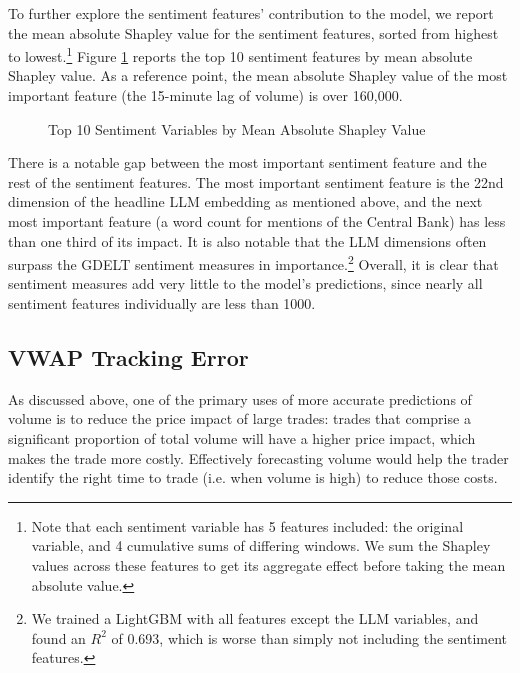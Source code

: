 \documentclass[12pt]{article}
\begin{document}
To further explore the sentiment features' contribution to the model, we report the mean absolute Shapley value for the sentiment features, sorted from highest to lowest.\footnote{Note that each sentiment variable has 5 features included: the original variable, and 4 cumulative sums of differing windows. We sum the Shapley values across these features to get its aggregate effect before taking the mean absolute value.} Figure \ref{fig:shapley_sentiment} reports the top 10 sentiment features by mean absolute Shapley value. As a reference point, the mean absolute Shapley value of the most important feature (the 15-minute lag of volume) is over 160,000.
\begin{figure}[H]
    \centering
    \caption{Top 10 Sentiment Variables by Mean Absolute Shapley Value}
    \label{fig:shapley_sentiment}
\end{figure}
There is a notable gap between the most important sentiment feature and the rest of the sentiment features. The most important sentiment feature is the 22nd dimension of the headline LLM embedding as mentioned above, and the next most important feature (a word count for mentions of the Central Bank) has less than one third of its impact. It is also notable that the LLM dimensions often surpass the GDELT sentiment measures in importance.\footnote{We trained a LightGBM with all features except the LLM variables, and found an $R^2$ of 0.693, which is worse than simply not including the sentiment features.} Overall, it is clear that sentiment measures add very little to the model's predictions, since nearly all sentiment features individually are less than 1000.

\subsection{VWAP Tracking Error}
As discussed above, one of the primary uses of more accurate predictions of volume is to reduce the price impact of large trades: trades that comprise a significant proportion of total volume will have a higher price impact, which makes the trade more costly. Effectively forecasting volume would help the trader identify the right time to trade (i.e. when volume is high) to reduce those costs.
\end{document}
